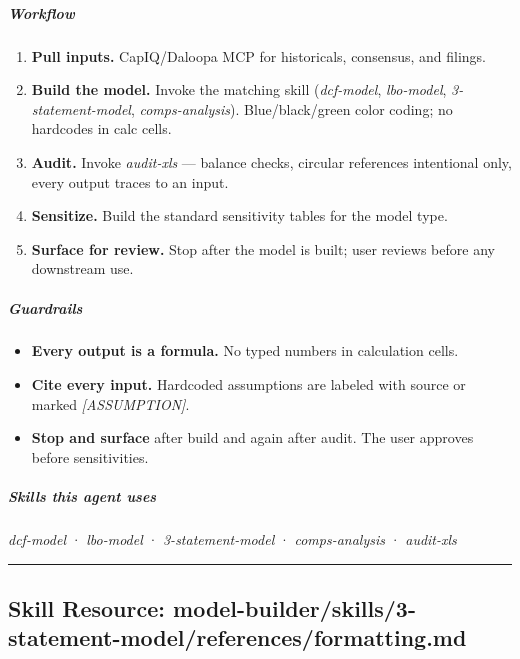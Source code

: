 \documentclass[11pt]{article}
\begin{document}
\subparagraph{Workflow}\mbox{}\par

\begin{enumerate}[leftmargin=*,itemsep=2pt,topsep=2pt]
\item {} \textbf{Pull inputs.} CapIQ/Daloopa MCP for historicals, consensus, and filings.
\item {} \textbf{Build the model.} Invoke the matching skill (\emph{dcf-model}, \emph{lbo-model}, \emph{3-statement-model}, \emph{comps-analysis}). Blue/black/green color coding; no hardcodes in calc cells.
\item {} \textbf{Audit.} Invoke \emph{audit-xls} — balance checks, circular references intentional only, every output traces to an input.
\item {} \textbf{Sensitize.} Build the standard sensitivity tables for the model type.
\item {} \textbf{Surface for review.} Stop after the model is built; user reviews before any downstream use.
\end{enumerate}

\subparagraph{Guardrails}\mbox{}\par

\begin{itemize}[leftmargin=*,itemsep=2pt,topsep=2pt]
\item {} \textbf{Every output is a formula.} No typed numbers in calculation cells.
\item {} \textbf{Cite every input.} Hardcoded assumptions are labeled with source or marked \emph{[ASSUMPTION]}.
\item {} \textbf{Stop and surface} after build and again after audit. The user approves before sensitivities.
\end{itemize}

\subparagraph{Skills this agent uses}\mbox{}\par

\emph{dcf-model} · \emph{lbo-model} · \emph{3-statement-model} · \emph{comps-analysis} · \emph{audit-xls}


\vspace{0.8em}\hrule\vspace{0.8em}

\subsection{Skill Resource: model-builder/skills/3-statement-model/references/formatting.md}\label{file:model-builder-skills-3-statement-model-references-formatting-md}
\end{document}
